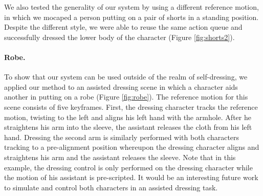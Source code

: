We also tested the generality of our system by using a different reference motion, in which we mocaped a person putting on a pair of shorts in a standing position. Despite the different style, we were able to reuse the same action queue and successfully dressed the lower body of the character (Figure \ref{fig:shorts2}).

\paragraph{Robe.} To show that our system can be used outside of the realm of self-dressing, we applied our method to an assisted dressing scene in which a character aids another in putting on a robe (Figure \ref{fig:robe}). The reference motion for this scene consists of five keyframes. First, the dressing character tracks the reference motion, twisting to the left and aligns his left hand with the armhole. After he straightens his arm into the sleeve, the assistant releases the cloth from his left hand. Dressing the second arm is similarly performed with both characters tracking to a pre-alignment position whereupon the dressing character aligns and straightens his arm and the assistant releases the sleeve. Note that in this example, the dressing control is only performed on the dressing character while the motion of his assistant is pre-scripted. It would be an interesting future work to simulate and control both characters in an assisted dressing task.
